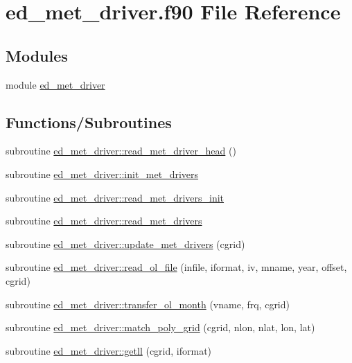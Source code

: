 \hypertarget{ed__met__driver_8f90}{}\section{ed\+\_\+met\+\_\+driver.\+f90 File Reference}
\label{ed__met__driver_8f90}
\subsection*{Modules}
\begin{DoxyCompactItemize}
\item 
module \hyperlink{namespaceed__met__driver}{ed\+\_\+met\+\_\+driver}
\end{DoxyCompactItemize}
\subsection*{Functions/\+Subroutines}
\begin{DoxyCompactItemize}
\item 
subroutine \hyperlink{namespaceed__met__driver_a0965b93e1a1d978fdadf4a72863ded51}{ed\+\_\+met\+\_\+driver\+::read\+\_\+met\+\_\+driver\+\_\+head} ()
\item 
subroutine \hyperlink{namespaceed__met__driver_a7804f50ae19e84e6e8e63f84bbe9606f}{ed\+\_\+met\+\_\+driver\+::init\+\_\+met\+\_\+drivers}
\item 
subroutine \hyperlink{namespaceed__met__driver_a74d852fbf8bace115f878f9eab8eff9f}{ed\+\_\+met\+\_\+driver\+::read\+\_\+met\+\_\+drivers\+\_\+init}
\item 
subroutine \hyperlink{namespaceed__met__driver_a3e78531a4abbaae7886333940f13ea3f}{ed\+\_\+met\+\_\+driver\+::read\+\_\+met\+\_\+drivers}
\item 
subroutine \hyperlink{namespaceed__met__driver_a5f35a6891b5eb05b93fef63398446519}{ed\+\_\+met\+\_\+driver\+::update\+\_\+met\+\_\+drivers} (cgrid)
\item 
subroutine \hyperlink{namespaceed__met__driver_ad21db672783de8f18b956464e83a7143}{ed\+\_\+met\+\_\+driver\+::read\+\_\+ol\+\_\+file} (infile, iformat, iv, mname, year, offset, cgrid)
\item 
subroutine \hyperlink{namespaceed__met__driver_afcd48149ca56209591b1e342819b6b35}{ed\+\_\+met\+\_\+driver\+::transfer\+\_\+ol\+\_\+month} (vname, frq, cgrid)
\item 
subroutine \hyperlink{namespaceed__met__driver_a13369db00ec309e44c4e995df3e960a3}{ed\+\_\+met\+\_\+driver\+::match\+\_\+poly\+\_\+grid} (cgrid, nlon, nlat, lon, lat)
\item 
subroutine \hyperlink{namespaceed__met__driver_a8fa5cd9bf3522980d46a383b55769126}{ed\+\_\+met\+\_\+driver\+::getll} (cgrid, iformat)
\end{DoxyCompactItemize}
